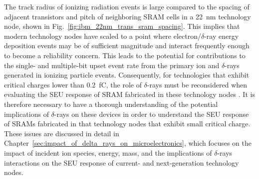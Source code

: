 The track radius of ionizing radiation events is large compared to the spacing of adjacent transistors and pitch of neighboring SRAM cells in a 22~nm technology node, shown in Fig.~\ref{fig:ibm_22nm_trans_sram_spacing}.
This implies that modern technology nodes have scaled to a point where electron/$\delta$-ray energy deposition events may be of sufficient magnitude and interact frequently enough to become a reliability concern.
This leads to the potential for contributions to the single- and multiple-bit upset event rate from the primary ion and $\delta$-rays generated in ionizing particle events.
Consequently, for technologies that exhibit critical charges lower than 0.2~fC, the role of $\delta$-rays must be reconsidered when evaluating the SEU response of SRAM fabricated in these technology nodes \cite{King:2010cu, King:2012cb}.
It is therefore necessary to have a thorough understanding of the potential implications of $\delta$-rays on these devices in order to understand the SEU response of SRAMs fabricated in that technology nodes that exhibit small critical charge.
These issues are discussed in detail in Chapter~\ref{sec:impact_of_delta_rays_on_microelectronics}, which focuses on the impact of incident ion species, energy, mass, and the implications of $\delta$-rays interactions on the SEU response of current- and next-generation technology nodes.

